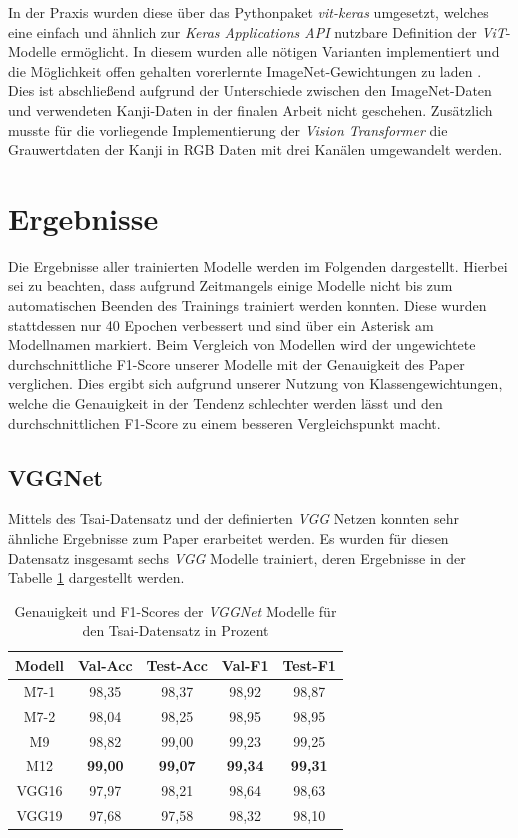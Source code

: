 \documentclass[twoside,a4paper]{IEEEtran}
\begin{document}
In der Praxis wurden diese über das Pythonpaket \emph{vit-keras} umgesetzt, welches eine einfach und ähnlich zur \emph{Keras Applications API} nutzbare Definition der \emph{ViT}-Modelle ermöglicht. In diesem wurden alle nötigen Varianten implementiert und die Möglichkeit offen gehalten vorerlernte ImageNet-Gewichtungen zu laden \cite{git_vit}. Dies ist abschließend aufgrund der Unterschiede zwischen den ImageNet-Daten und verwendeten Kanji-Daten in der finalen Arbeit nicht geschehen. Zusätzlich musste für die vorliegende Implementierung der \emph{Vision Transformer} die Grauwertdaten der Kanji in RGB Daten mit drei Kanälen umgewandelt werden. 
\section{Ergebnisse} %
Die Ergebnisse aller trainierten Modelle werden im Folgenden dargestellt. Hierbei sei zu beachten, dass aufgrund Zeitmangels einige Modelle nicht bis zum automatischen Beenden des Trainings trainiert werden konnten. Diese wurden stattdessen nur 40 Epochen verbessert und sind über ein Asterisk am Modellnamen markiert. Beim Vergleich von Modellen wird der ungewichtete durchschnittliche F1-Score unserer Modelle mit der Genauigkeit des Paper \cite{RHC} verglichen. Dies ergibt sich aufgrund unserer Nutzung von Klassengewichtungen, welche die Genauigkeit in der Tendenz schlechter werden lässt und den durchschnittlichen F1-Score zu einem besseren Vergleichspunkt macht. 

\subsection{VGGNet}

Mittels des Tsai-Datensatz und der definierten \emph{VGG} Netzen konnten sehr ähnliche Ergebnisse zum Paper \cite{RHC} erarbeitet werden. Es wurden für diesen Datensatz insgesamt sechs \emph{VGG} Modelle trainiert, deren Ergebnisse in der Tabelle \ref{vgg_ergebnis_tsai} dargestellt werden.

\begin{table}[!htb]
	\caption{Genauigkeit und F1-Scores der \emph{VGGNet} Modelle für den Tsai-Datensatz in Prozent}
	\label{vgg_ergebnis_tsai}
	\centering
	\begin{tabular}{|c|c|c|c|c|}
		\hline
		Modell & Val-Acc & Test-Acc & Val-F1 & Test-F1\\
		\hline
		\hline
		M7-1 & 98,35 & 98,37 & 98,92 & 98,87\\
		\hline
		M7-2 & 98,04 & 98,25 & 98,95 & 98,95\\
		\hline
		M9 & 98,82 & 99,00 & 99,23 & 99,25\\
		\hline 
		M12 & \textbf{99,00} & \textbf{99,07} & \textbf{99,34} & \textbf{99,31}\\
		\hline 
		VGG16 & 97,97 & 98,21 & 98,64 & 98,63\\
		\hline 
		VGG19 & 97,68 & 97,58 & 98,32 & 98,10\\
		\hline 
	\end{tabular}
\end{table}
\end{document}
